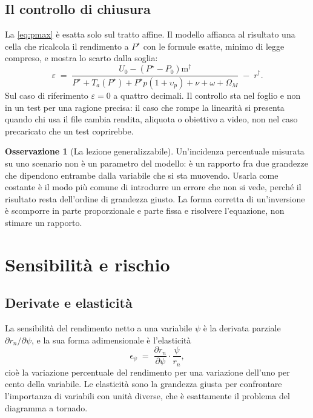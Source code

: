 \documentclass[11pt,a4paper]{article}
\theoremstyle{definition}
\newtheorem{osservazione}[definizione]{Osservazione}
\theoremstyle{plain}
\begin{document}
\subsection{Il controllo di chiusura}

La \eqref{eq:pmax} è esatta solo sul tratto affine. Il modello affianca al risultato una cella che ricalcola il rendimento a $P^\star$ con le formule esatte, minimo di legge compreso, e mostra lo scarto dalla soglia:
\begin{equation}
\varepsilon \;=\; \frac{U_0 - (P^\star-P_0)\mathrm{m}^\dagger}{P^\star + T_a(P^\star) + P^\star p(1+\upsilon_p) + \nu + \omega + \Omega_M} \;-\; r^\dagger .
\label{eq:controllo}
\end{equation}
Sul caso di riferimento $\varepsilon = 0$ a quattro decimali. Il controllo sta nel foglio e non in un test per una ragione precisa: il caso che rompe la linearità si presenta quando chi usa il file cambia rendita, aliquota o obiettivo a video, non nel caso precaricato che un test coprirebbe.

\begin{osservazione}[La lezione generalizzabile]
Un'incidenza percentuale misurata su uno scenario non è un parametro del modello: è un rapporto fra due grandezze che dipendono entrambe dalla variabile che si sta muovendo. Usarla come costante è il modo più comune di introdurre un errore che non si vede, perché il risultato resta dell'ordine di grandezza giusto. La forma corretta di un'inversione è scomporre in parte proporzionale e parte fissa e risolvere l'equazione, non stimare un rapporto.
\end{osservazione}

\section{Sensibilità e rischio}

\subsection{Derivate e elasticità}

La sensibilità del rendimento netto a una variabile $\psi$ è la derivata parziale $\partial r_n/\partial \psi$, e la sua forma adimensionale è l'elasticità
\begin{equation}
\epsilon_\psi \;=\; \frac{\partial r_n}{\partial \psi}\cdot\frac{\psi}{r_n},
\label{eq:elasticita}
\end{equation}
cioè la variazione percentuale del rendimento per una variazione dell'uno per cento della variabile. Le elasticità sono la grandezza giusta per confrontare l'importanza di variabili con unità diverse, che è esattamente il problema del diagramma a tornado.
\end{document}
